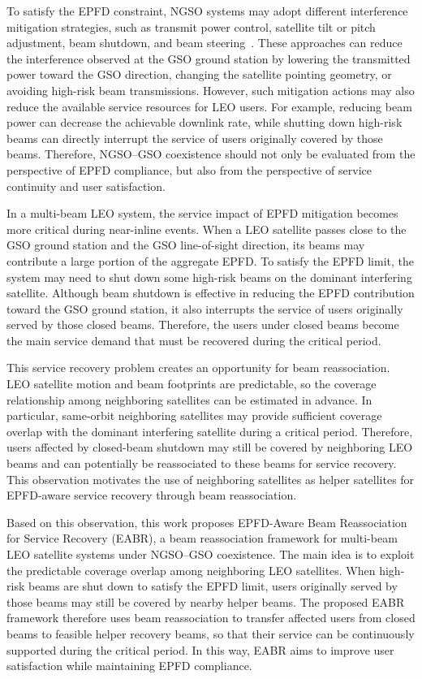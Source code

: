 To satisfy the EPFD constraint, NGSO systems may adopt different interference mitigation strategies, such as transmit power control, satellite tilt or pitch adjustment, beam shutdown, and beam steering~\cite{hills2022beamsteering,jalali2023joint,li2021progressive}. These approaches can reduce the interference observed at the GSO ground station by lowering the transmitted power toward the GSO direction, changing the satellite pointing geometry, or avoiding high-risk beam transmissions. However, such mitigation actions may also reduce the available service resources for LEO users. For example, reducing beam power can decrease the achievable downlink rate, while shutting down high-risk beams can directly interrupt the service of users originally covered by those beams. Therefore, NGSO--GSO coexistence should not only be evaluated from the perspective of EPFD compliance, but also from the perspective of service continuity and user satisfaction.

In a multi-beam LEO system, the service impact of EPFD mitigation becomes more critical during near-inline events. When a LEO satellite passes close to the GSO ground station and the GSO line-of-sight direction, its beams may contribute a large portion of the aggregate EPFD. To satisfy the EPFD limit, the system may need to shut down some high-risk beams on the dominant interfering satellite. Although beam shutdown is effective in reducing the EPFD contribution toward the GSO ground station, it also interrupts the service of users originally served by those closed beams. Therefore, the users under closed beams become the main service demand that must be recovered during the critical period.

This service recovery problem creates an opportunity for beam reassociation. LEO satellite motion and beam footprints are predictable, so the coverage relationship among neighboring satellites can be estimated in advance. In particular, same-orbit neighboring satellites may provide sufficient coverage overlap with the dominant interfering satellite during a critical period. Therefore, users affected by closed-beam shutdown may still be covered by neighboring LEO beams and can potentially be reassociated to these beams for service recovery. This observation motivates the use of neighboring satellites as helper satellites for EPFD-aware service recovery through beam reassociation.

Based on this observation, this work proposes EPFD-Aware Beam Reassociation for Service Recovery (EABR), a beam reassociation framework for multi-beam LEO satellite systems under NGSO--GSO coexistence. The main idea is to exploit the predictable coverage overlap among neighboring LEO satellites. When high-risk beams are shut down to satisfy the EPFD limit, users originally served by those beams may still be covered by nearby helper beams. The proposed EABR framework therefore uses beam reassociation to transfer affected users from closed beams to feasible helper recovery beams, so that their service can be continuously supported during the critical period. In this way, EABR aims to improve user satisfaction while maintaining EPFD compliance.

